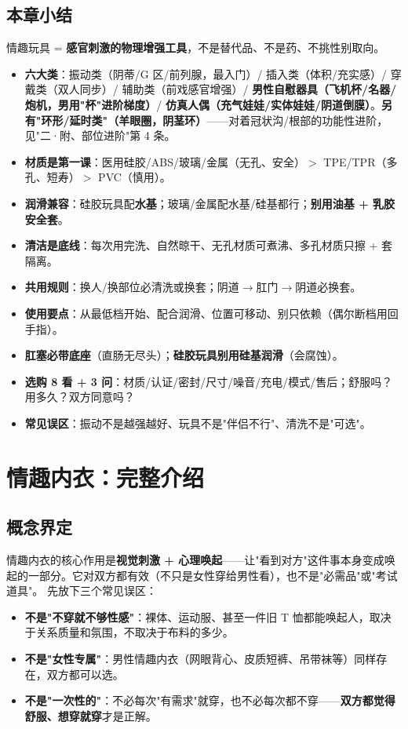 \documentclass[12pt,UTF8,openany]{ctexbook}
\begin{document}
\subsection*{本章小结}
情趣玩具 = \textbf{感官刺激的物理增强工具}，不是替代品、不是药、不挑性别取向。
\begin{itemize}[leftmargin=2em,itemsep=0.2em]
  \item \textbf{六大类}：振动类（阴蒂/G 区/前列腺，最入门）/ 插入类（体积/充实感）/ 穿戴类（双人同步）/ 辅助类（前戏感官增强）/ \textbf{男性自慰器具（飞机杯/名器/炮机，男用"杯"进阶梯度）}/ \textbf{仿真人偶（充气娃娃/实体娃娃/阴道倒膜）}。\textbf{另有"环形/延时类"（羊眼圈，阴茎环）}——对着冠状沟/根部的功能性进阶，见"二·附、部位进阶"第 4 条。
  \item \textbf{材质是第一课}：医用硅胶/ABS/玻璃/金属（无孔、安全）$>$ TPE/TPR（多孔、短寿）$>$ PVC（慎用）。
  \item \textbf{润滑兼容}：硅胶玩具配\textbf{水基}；玻璃/金属配水基/硅基都行；\textbf{别用油基 + 乳胶安全套}。
  \item \textbf{清洁是底线}：每次用完洗、自然晾干、无孔材质可煮沸、多孔材质只擦 + 套隔离。
  \item \textbf{共用规则}：换人/换部位必清洗或换套；阴道$\to$肛门$\to$阴道必换套。
  \item \textbf{使用要点}：从最低档开始、配合润滑、位置可移动、别只依赖（偶尔断档用回手指）。
  \item \textbf{肛塞必带底座}（直肠无尽头）；\textbf{硅胶玩具别用硅基润滑}（会腐蚀）。
  \item \textbf{选购 8 看 + 3 问}：材质/认证/密封/尺寸/噪音/充电/模式/售后；舒服吗？用多久？双方同意吗？
  \item \textbf{常见误区}：振动不是越强越好、玩具不是"伴侣不行"、清洗不是"可选"。
\end{itemize}

\section{情趣内衣：完整介绍}

\subsection*{概念界定}
情趣内衣的核心作用是\textbf{视觉刺激 + 心理唤起}——让"看到对方"这件事本身变成唤起的一部分。它对双方都有效（不只是女性穿给男性看），也不是"必需品"或"考试道具"。
先放下三个常见误区：
\begin{itemize}[leftmargin=2em,itemsep=0.3em]
  \item \textbf{不是"不穿就不够性感"}：裸体、运动服、甚至一件旧 T 恤都能唤起人，取决于关系质量和氛围，不取决于布料的多少。
  \item \textbf{不是"女性专属"}：男性情趣内衣（网眼背心、皮质短裤、吊带袜等）同样存在，双方都可以选。
  \item \textbf{不是"一次性的"}：不必每次"有需求"就穿，也不必每次都不穿——\textbf{双方都觉得舒服、想穿就穿}才是正解。
\end{itemize}
\end{document}
